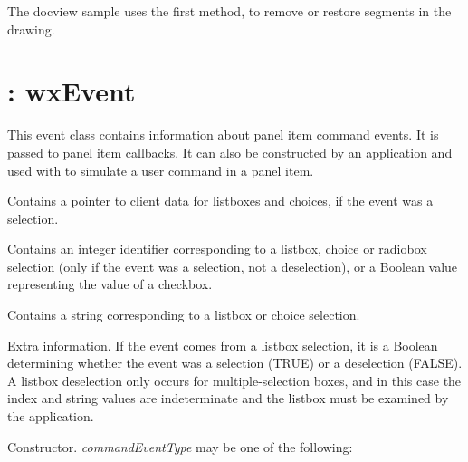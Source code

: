 The docview sample uses the first method, to remove or restore segments
in the drawing.

\section{: wxEvent}\label{wxcommandevent}

This event class contains information about panel item command events.
It is passed to  panel item callbacks. It
can also be constructed by an application and used with \rtfsp
to simulate a user command in a panel item.



Contains a pointer to client data for listboxes and choices, if the event
was a selection.



Contains an integer identifier corresponding to a listbox, choice or
radiobox selection (only if the event was a selection, not a
deselection), or a Boolean value representing the value of a checkbox.



Contains a string corresponding to a listbox or choice selection.



Extra information. If the event comes from a listbox selection, it is
a Boolean determining whether the event was a selection (TRUE) or a
deselection (FALSE). A listbox deselection only occurs for
multiple-selection boxes, and in this case the index and string values
are indeterminate and the listbox must be examined by the application.



Constructor. {\it commandEventType} may be one of the following:

